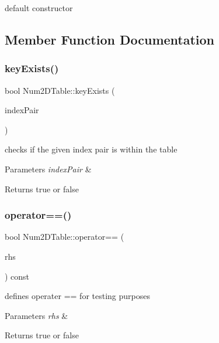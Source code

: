 default constructor 

\subsection{Member Function Documentation}
\mbox{\label{class_num2_d_table_a97c0b41ef1b5a47fcc9fc9889453ec59}} 
\subsubsection{\texorpdfstring{key\+Exists()}{keyExists()}}
{\footnotesize\ttfamily bool Num2\+D\+Table\+::key\+Exists (\begin{DoxyParamCaption}\item[{pair$<$ int, int $>$}]{index\+Pair }\end{DoxyParamCaption})\hspace{0.3cm}{\ttfamily [inline]}}

checks if the given index pair is within the table 
\begin{DoxyParams}{Parameters}
{\em index\+Pair} & \\
\hline
\end{DoxyParams}
\begin{DoxyReturn}{Returns}
true or false 
\end{DoxyReturn}
\mbox{\label{class_num2_d_table_a037b9168eac3a5d9f806fac1fd0e2a36}} 
\subsubsection{\texorpdfstring{operator==()}{operator==()}}
{\footnotesize\ttfamily bool Num2\+D\+Table\+::operator== (\begin{DoxyParamCaption}\item[{const \mbox{\hyperlink{class_num2_d_table}{Num2\+D\+Table}} \&}]{rhs }\end{DoxyParamCaption}) const\hspace{0.3cm}{\ttfamily [inline]}}

defines operater == for testing purposes 
\begin{DoxyParams}{Parameters}
{\em rhs} & \\
\hline
\end{DoxyParams}
\begin{DoxyReturn}{Returns}
true or false 
\end{DoxyReturn}
\mbox{\label{class_num2_d_table_ac87a39a241ca9a1fa4e87ec6414761b7}} 
